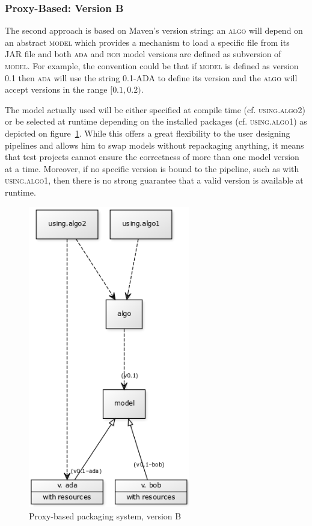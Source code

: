 \documentclass{article}
\newcommand{\ID}[1]{{\textsc{#1}}}
\newcommand{\JAR}{JAR\xspace}
\begin{document}
\begin{appendices}
\subsubsection{Proxy-Based: Version B}

The second approach is based on Maven's version string: an \ID{algo} will depend on an abstract
\ID{model} which provides a mechanism to load a specific file from its \JAR file and both \ID{ada}
and \ID{bob} model versions are defined as subversion of \ID{model}. For example, the convention
could be that if \ID{model} is defined as version \ID{0.1} then \ID{ada} will use the string
\ID{0.1-ADA} to define its version and the \ID{algo} will accept versions in the range $ [0.1,0.2)
$.

The model actually used will be either specified at compile time (cf. \ID{using.algo2}) or be
selected at runtime depending on the installed packages (cf. \ID{using.algo1}) as depicted on
figure~\ref{fig:pkgsysB}. While this offers a great flexibility to the user designing pipelines and
allows him to swap models without repackaging anything, it means that test projects cannot ensure
the correctness of more than one model version at a time. Moreover, if no specific version is bound
to the pipeline, such as with \ID{using.algo1}, then there is no strong guarantee that a valid
version is available at runtime.

\begin{figure}
    \centering
    \includegraphics[width=200pt]{res/packaging_version_B.png}
    \caption{Proxy-based packaging system, version B}
    \label{fig:pkgsysB}
\end{figure}



\end{appendices}
\end{document}

